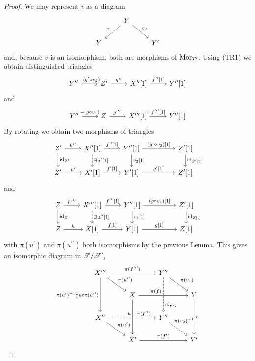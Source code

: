 \documentclass[dissertation.tex]{subfiles}
\begin{document}
\begin{lem}
  \begin{proof}
    We may represent $v$ as a diagram
    $$\begin{tikzcd}
      & Y \arrow[swap]{ld}{v_1}\arrow{rd}{v_2}\\
      Y & & Y^\prime
    \end{tikzcd}$$
    and, because $v$ is an isomorphism, both are morphisms of $\operatorname{Mor}_{T^\prime}$.
    Using (TR1) we obtain distinguished triangles
    $$\begin{tikzcd}
      Y^{\prime\prime} \arrow{r}{-(g^\prime \circ v_2)} & Z^\prime \arrow{r}{h^{\prime\prime}} & X^{\prime\prime}[1] \arrow{r}{f^{\prime\prime}[1]} & Y^{\prime\prime}[1]
    \end{tikzcd}$$
    and
    $$\begin{tikzcd}
      Y^{\prime\prime} \arrow{r}{-(g \circ v_1)} & Z \arrow{r}{g^{\prime\prime\prime}} & X^{\prime\prime\prime}[1] \arrow{r}{f^{\prime\prime\prime}[1]} & Y^{\prime\prime}[1]
    \end{tikzcd}$$
    By rotating we obtain two morphisms of triangles
    $$\begin{tikzcd}
      Z^\prime \arrow{r}{h^{\prime\prime}}\arrow{d}{\id_{Z^\prime}} & X^{\prime\prime}[1] \arrow{r}{f^{\prime\prime}[1]}\arrow[dashed]{d}{\exists u^\prime[1]} & Y^{\prime\prime}[1] \arrow{rr}{(g^\prime \circ v_2)[1]}\arrow{d}{v_2[1]} & & Z^\prime[1]\arrow{d}{\id_{Z^\prime[1]}}\\
      Z^\prime \arrow{r}{h^\prime} & X^\prime[1] \arrow{r}{f^\prime[1]} & Y^\prime[1] \arrow{rr}{g^\prime[1]} & & Z^\prime[1]
    \end{tikzcd}$$
    and
    $$\begin{tikzcd}
      Z \arrow{r}{h^{\prime\prime\prime}}\arrow{d}{\id_Z} & X^{\prime\prime\prime}[1] \arrow{r}{f^{\prime\prime\prime}[1]}\arrow[dashed]{d}{\exists u^{\prime\prime}[1]} & Y^{\prime\prime}[1] \arrow{rr}{(g \circ v_1)[1]}\arrow{d}{v_1[1]} & & Z^\prime[1]\arrow{d}{\id_{Z[1]}}\\
      Z \arrow{r}{h} & X[1] \arrow{r}{f[1]} & Y[1] \arrow{rr}{g[1]} & & Z[1]
    \end{tikzcd}$$
    with $\pi(u^\prime)$ and $\pi(u^{\prime\prime})$ both isomorphisms by the previous Lemma.
    This gives an isomorphic diagram in $\mathscr{T}/\mathscr{T}^\prime$,
    $$\begin{tikzcd}
      X^{\prime\prime\prime} \arrow[swap]{dd}{\pi(u^\prime)^{-1} \circ u \circ \pi(u^{\prime\prime})}\arrow{rr}{\pi(f^{\prime\prime\prime})}\arrow{rd}{\pi(u^{\prime\prime})} & & Y^{\prime\prime}\arrow[dashed,pos=0.8]{dd}{\id_{Y^\prime\prime}}\arrow{rd}{\pi(v_1)}\\
      & X\arrow[pos=0.35]{rr}{\pi(f)}\arrow[swap,pos=0.4]{dd}{u} & & Y\arrow{dd}{v}\\
      X^{\prime\prime}\arrow[dashed,pos=0.75]{rr}{\pi(f^{\prime\prime})}\arrow{rd}{\pi(u^\prime)} & & Y^{\prime\prime}\arrow[dashed,pos=0.2]{rd}{\pi(v_2)^{-1}}\\
      & X^\prime \arrow{rr}{\pi(f^\prime)} & & Y^\prime
    \end{tikzcd}$$

  \end{proof}
\end{lem}
\end{document}

